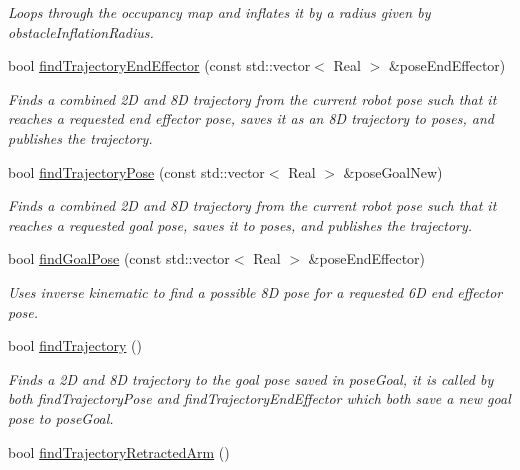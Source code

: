 \begin{DoxyCompactItemize}
\begin{DoxyCompactList}\small\item\em Loops through the occupancy map and inflates it by a radius given by obstacle\-Inflation\-Radius. \end{DoxyCompactList}\item 
bool \hyperlink{classSquirrelMotionPlanner_1_1Planner_aa3b43ad32ef2dbca9fd4c3fedfab1ae6}{find\-Trajectory\-End\-Effector} (const std\-::vector$<$ Real $>$ \&pose\-End\-Effector)
\begin{DoxyCompactList}\small\item\em Finds a combined 2\-D and 8\-D trajectory from the current robot pose such that it reaches a requested end effector pose, saves it as an 8\-D trajectory to poses, and publishes the trajectory. \end{DoxyCompactList}\item 
bool \hyperlink{classSquirrelMotionPlanner_1_1Planner_ac682a2ee500b2b5b8f70fc9b22c65a29}{find\-Trajectory\-Pose} (const std\-::vector$<$ Real $>$ \&pose\-Goal\-New)
\begin{DoxyCompactList}\small\item\em Finds a combined 2\-D and 8\-D trajectory from the current robot pose such that it reaches a requested goal pose, saves it to poses, and publishes the trajectory. \end{DoxyCompactList}\item 
bool \hyperlink{classSquirrelMotionPlanner_1_1Planner_a20d0554b6a2df4d5d8f8a128d93a61d4}{find\-Goal\-Pose} (const std\-::vector$<$ Real $>$ \&pose\-End\-Effector)
\begin{DoxyCompactList}\small\item\em Uses inverse kinematic to find a possible 8\-D pose for a requested 6\-D end effector pose. \end{DoxyCompactList}\item 
bool \hyperlink{classSquirrelMotionPlanner_1_1Planner_a683a5bf0c8383d4a491d1738a6600ed6}{find\-Trajectory} ()
\begin{DoxyCompactList}\small\item\em Finds a 2\-D and 8\-D trajectory to the goal pose saved in pose\-Goal, it is called by both find\-Trajectory\-Pose and find\-Trajectory\-End\-Effector which both save a new goal pose to pose\-Goal. \end{DoxyCompactList}\item 
bool \hyperlink{classSquirrelMotionPlanner_1_1Planner_a4be47ed5faec330e83da9edd0c5ac1ec}{find\-Trajectory\-Retracted\-Arm} ()

\end{DoxyCompactItemize}
